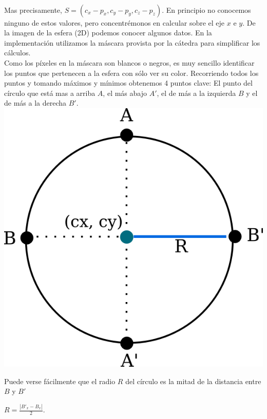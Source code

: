 $ $\newline

Mas precisamente, $S = (c_{x} - p_{x}, c_{y} - p_{y}, c_{z} - p_{z}).$ En principio no conocemos ninguno de estos valores, pero concentrémonos en calcular sobre el eje $x$ e $y$. De la imagen de la esfera (2D) podemos conocer algunos datos. En la implementación utilizamos la máscara provista por la cátedra para simplificar los cálculos. \\

Como los píxeles en la máscara son blancos o negros, es muy sencillo identificar los puntos que pertenecen a la esfera con sólo ver su color. Recorriendo todos los puntos y tomando máximos y mínimos obtenemos 4 puntos clave: El punto del círculo que está mas a arriba $A$, el más abajo $A'$, el de más a la izquierda $B$ y el de más a la derecha $B'$. \\

{\centering
    \includegraphics[scale=0.5]{informe/imagenes/esfera/circulo.png} \\
}

Puede verse fácilmente que el radio $R$ del círculo es la mitad de la distancia entre $B$ y $B'$

\begin{center}
$R = \frac{|B'_x - B_x|}{2}$.
\end{center}

